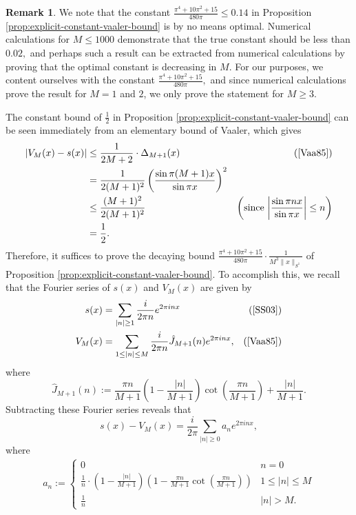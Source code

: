 \documentclass[11pt,letterpaper,reqno]{amsart}
\theoremstyle{definition}
\newtheorem{remark}[theorem]{Remark}
\numberwithin{equation}{section}
\numberwithin{figure}{section}
\numberwithin{table}{section}
\begin{document}
\begin{remark}
    We note that the constant $\frac{\pi^4 + 10\pi^2 + 15}{480\pi} \leq 0.14$ in Proposition \ref{prop:explicit-constant-vaaler-bound} is by no means optimal. Numerical calculations for $M \leq 1000$ demonstrate that the true constant should be less than $0.02,$ and perhaps such a result can be extracted from numerical calculations by proving that the optimal constant is decreasing in $M.$ For our purposes, we content ourselves with the constant $\frac{\pi^4 + 10\pi^2 + 15}{480\pi},$ and since numerical calculations prove the result for $M = 1$ and $2$, we only prove the statement for $M \geq 3.$
\end{remark}

The constant bound of $\frac{1}{2}$ in Proposition \ref{prop:explicit-constant-vaaler-bound} can be seen immediately from an elementary bound of Vaaler, which gives
\begin{align}
    \left| V_M(x) - s(x) \right| &\leq \frac{1}{2M + 2} \cdot \Delta_{M + 1}(x) & \left( \text{\cite[Theorem 18]{Vaa85}} \right)\\
    &=  \frac{1}{2(M + 1)^2} \left( \frac{\sin \pi (M + 1) x}{ \sin \pi x}  \right)^2\\
    &\leq \frac{(M + 1)^2}{2(M + 1)^2} & \left(\text{since $\left| \frac{\sin \pi n x}{ \sin \pi x} \right| \leq n$} \right)\\
    &= \frac{1}{2}.
\end{align}
Therefore, it suffices to prove the decaying bound $\frac{\pi^4 + 10\pi^2 + 15 }{480\pi} \cdot \frac{1}{M^3 \lVert x \rVert_{S^1}}$ of Proposition \ref{prop:explicit-constant-vaaler-bound}. To accomplish this, we recall that the Fourier series of $s(x)$ and $V_M(x)$ are given by
\begin{align}
    s(x) &= \sum_{|n| \ge 1} \frac{i}{2\pi n} e^{2\pi i n x} & \left( \text{\cite[\S3.2.2(4)]{SS03}}  \right)\\
    V_M(x) &= \sum_{1 \leq | n| \leq M} \frac{i}{2\pi n} \hat{J}_{M + 1}(n) e^{2\pi i n x}, & \left( \text{\cite[Theorem 6, Theorem 18]{Vaa85}}  \right)
\end{align}
where
    $$\hat{J}_{M+1}(n) := \frac{\pi n}{M + 1} \left(1 -  \frac{|n|}{M + 1}  \right) \cot\left( \frac{\pi n}{M + 1} \right) + \frac{|n|}{M + 1}.$$
Subtracting these Fourier series reveals that
$$s(x) - V_M(x) = \frac{i}{2\pi} \sum_{|n| \geq 0} a_n e^{2\pi i n x},$$
where
\begin{align}
    a_n :=  \begin{cases}
        0 & n = 0\\
        \frac{1}{n} \cdot \left( 1 -  \frac{|n|}{M + 1}  \right) \left( 1 - \frac{\pi n}{M + 1} \cot \left( \frac{\pi n}{M + 1}  \right)  \right) & 1 \leq |n| \leq M\\
        \frac{1}{n} & |n| > M.
    \end{cases}
\end{align}
\end{document}
